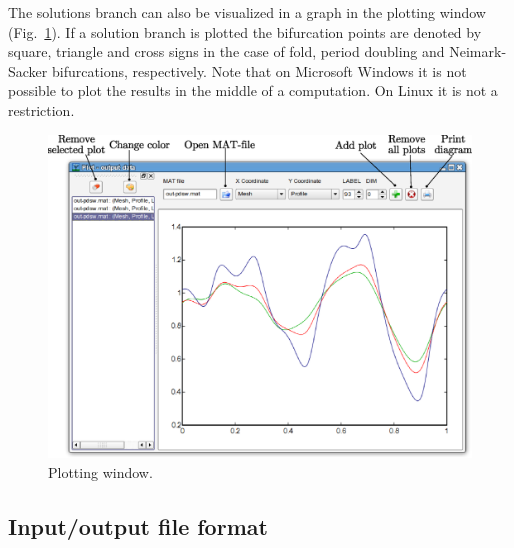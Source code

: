 \documentclass[10pt,a4paper]{ddedoc}
\begin{document}
The solutions branch can also be visualized in a graph in the plotting window (Fig.\
\ref{plotwindow}). If a solution branch is plotted the bifurcation points are
denoted by square, triangle and cross signs in the case of fold, period doubling
and Neimark-Sacker bifurcations, respectively. Note that on Microsoft Windows it is not
possible to plot the results in the middle of a computation. On Linux it is not
a restriction.
\begin{figure}[bth!]
\begin{center}
\includegraphics[scale=0.5]{fig/plotwindow.eps}
\caption{Plotting window.}
\label{plotwindow}
\end{center}
\end{figure}

\subsection{Input/output file format}
\end{document}
